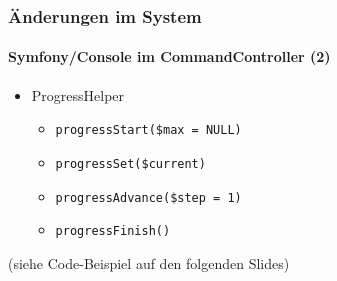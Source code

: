 
\begin{frame}[fragile]
	\frametitle{Änderungen im System}
	\framesubtitle{Symfony/Console im CommandController (2)}

	\lstset{basicstyle=\tiny\ttfamily}

	\begin{itemize}
		\item \smaller ProgressHelper
			\begin{itemize}
				\item \smaller\texttt{progressStart(\$max = NULL)}
				\item \texttt{progressSet(\$current)}
				\item \texttt{progressAdvance(\$step = 1)}
				\item \texttt{progressFinish()}
			\end{itemize}
	\end{itemize}

	\smaller
		(siehe Code-Beispiel auf den folgenden Slides)
	\normalsize

\end{frame}


